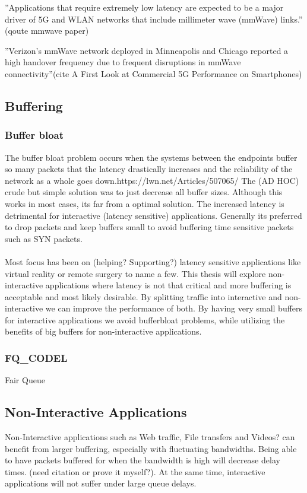\documentclass[a4paper,english, 11pt]{report}
\begin{document}
''Applications that require extremely low latency are
expected to be a major driver of 5G and WLAN networks that
include millimeter wave (mmWave) links.'' (qoute mmwave paper)

''Verizon’s mmWave network deployed in
Minneapolis and Chicago reported a high handover frequency
due to frequent disruptions in mmWave connectivity''(cite A First Look at Commercial 5G Performance on Smartphones)

\subsection{Buffering}
\subsubsection{Buffer bloat}
The buffer bloat problem occurs when the systems between the endpoints buffer so many packets that the latency drastically increases and the reliability of the network as a whole goes down.{https://lwn.net/Articles/507065/} The (AD HOC) crude but simple solution was to just decrease all buffer sizes. Although this works in most cases, its far from a optimal solution. The increased latency is detrimental for interactive (latency sensitive) applications. Generally its preferred to drop packets and keep buffers small to avoid buffering time sensitive packets such as SYN packets.\\\\

Most focus has been on (helping? Supporting?) latency sensitive applications like virtual reality or remote surgery to name a few. This thesis will explore non-interactive applications where latency is not that critical and more buffering is acceptable and most likely desirable. By splitting traffic into interactive and non-interactive we can improve the performance of both. By having very small buffers for interactive applications we avoid bufferbloat problems, while utilizing the benefits of big buffers for non-interactive applications.

\subsubsection{FQ\_CODEL}
Fair Queue

\subsection{Non-Interactive Applications}
Non-Interactive applications such as Web traffic, File transfers and Videos? can benefit from larger buffering, especially with fluctuating bandwidths. Being able to have packets buffered for when the bandwidth is high will decrease delay times. (need citation or prove it myself?). At the same time, interactive applications will not suffer under large queue delays.
\end{document}
